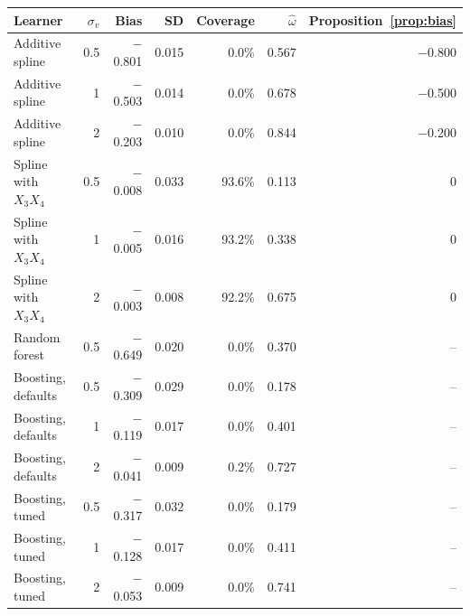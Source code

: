 \begin{tabular}{lrrrrrr}
\toprule
Learner & $\sigma_v$ & Bias & SD & Coverage & $\hat\omega$ & Proposition~\ref{prop:bias} \\
\midrule
Additive spline & 0.5 & $-$0.801 & 0.015 & 0.0\% & 0.567 & $-$0.800 \\
Additive spline & 1 & $-$0.503 & 0.014 & 0.0\% & 0.678 & $-$0.500 \\
Additive spline & 2 & $-$0.203 & 0.010 & 0.0\% & 0.844 & $-$0.200 \\
\addlinespace
Spline with $X_3 X_4$ & 0.5 & $-$0.008 & 0.033 & 93.6\% & 0.113 & 0 \\
Spline with $X_3 X_4$ & 1 & $-$0.005 & 0.016 & 93.2\% & 0.338 & 0 \\
Spline with $X_3 X_4$ & 2 & $-$0.003 & 0.008 & 92.2\% & 0.675 & 0 \\
\addlinespace
Random forest & 0.5 & $-$0.649 & 0.020 & 0.0\% & 0.370 & -- \\
\addlinespace
Boosting, defaults & 0.5 & $-$0.309 & 0.029 & 0.0\% & 0.178 & -- \\
Boosting, defaults & 1 & $-$0.119 & 0.017 & 0.0\% & 0.401 & -- \\
Boosting, defaults & 2 & $-$0.041 & 0.009 & 0.2\% & 0.727 & -- \\
\addlinespace
Boosting, tuned & 0.5 & $-$0.317 & 0.032 & 0.0\% & 0.179 & -- \\
Boosting, tuned & 1 & $-$0.128 & 0.017 & 0.0\% & 0.411 & -- \\
Boosting, tuned & 2 & $-$0.053 & 0.009 & 0.0\% & 0.741 & -- \\
\bottomrule
\end{tabular}
